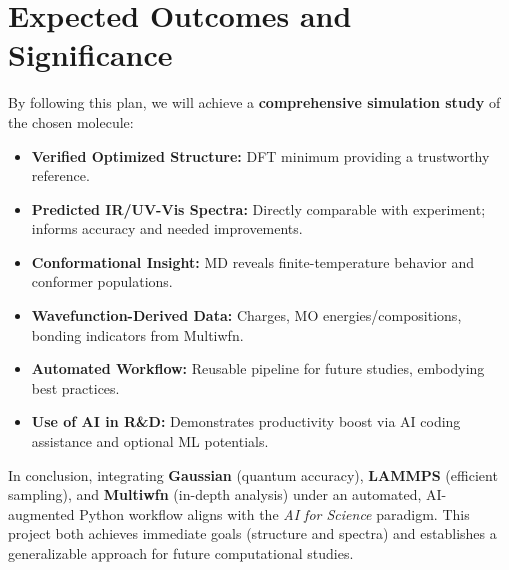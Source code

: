\documentclass[11pt]{article}
\begin{document}
\section{Expected Outcomes and Significance}
By following this plan, we will achieve a \textbf{comprehensive simulation study} of the chosen molecule:
\begin{itemize}
  \item \textbf{Verified Optimized Structure:} DFT minimum providing a trustworthy reference.
  \item \textbf{Predicted IR/UV-Vis Spectra:} Directly comparable with experiment; informs accuracy and needed improvements.
  \item \textbf{Conformational Insight:} MD reveals finite-temperature behavior and conformer populations.
  \item \textbf{Wavefunction-Derived Data:} Charges, MO energies/compositions, bonding indicators from Multiwfn.
  \item \textbf{Automated Workflow:} Reusable pipeline for future studies, embodying best practices.
  \item \textbf{Use of AI in R\&D:} Demonstrates productivity boost via AI coding assistance and optional ML potentials.
\end{itemize}

In conclusion, integrating \textbf{Gaussian} (quantum accuracy), \textbf{LAMMPS} (efficient sampling), and \textbf{Multiwfn} (in-depth analysis) under an automated, AI-augmented Python workflow aligns with the \emph{AI for Science} paradigm. This project both achieves immediate goals (structure and spectra) and establishes a generalizable approach for future computational studies.
\end{document}
